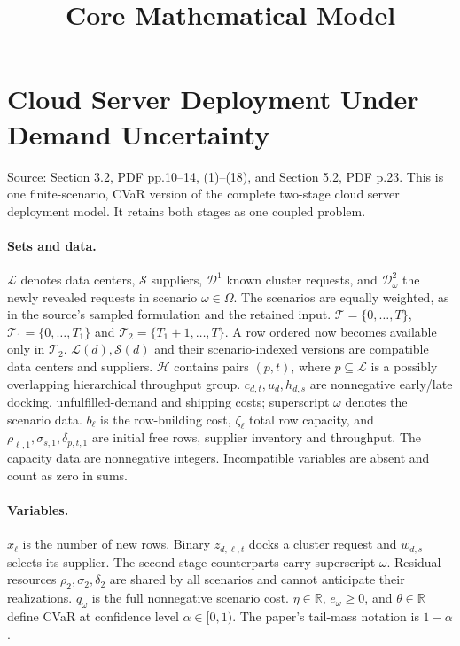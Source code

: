 \documentclass{article}
\title{Core Mathematical Model}
\date{}
\begin{document}
\maketitle

\section*{Cloud Server Deployment Under Demand Uncertainty}

Source: Section 3.2, PDF pp.10--14, (1)--(18), and Section 5.2, PDF p.23.
This is one finite-scenario, CVaR version of the complete two-stage cloud
server deployment model. It retains both stages as one coupled problem.

\paragraph{Sets and data.}
$\mathcal L$ denotes data centers, $\mathcal S$ suppliers,
$\mathcal D^1$ known cluster requests, and $\mathcal D^2_\omega$ the newly
revealed requests in scenario $\omega\in\Omega$. The scenarios are equally
weighted, as in the source's sampled formulation and the retained input.
$\mathcal T=\{0,\ldots,T\}$, $\mathcal T_1=\{0,\ldots,T_1\}$ and
$\mathcal T_2=\{T_1+1,\ldots,T\}$. A row ordered now becomes available only
in $\mathcal T_2$. $\mathcal L(d),\mathcal S(d)$ and their scenario-indexed
versions are compatible data centers and suppliers. $\mathcal H$ contains
pairs $(p,t)$, where $p\subseteq\mathcal L$ is a possibly overlapping
hierarchical throughput group. $c_{d,t},u_d,h_{d,s}$ are nonnegative
early/late docking, unfulfilled-demand and shipping costs; superscript
$\omega$ denotes the scenario data. $b_\ell$ is the row-building cost,
$\zeta_\ell$ total row capacity, and $\rho_{\ell,1},\sigma_{s,1},
\delta_{p,t,1}$ are initial free rows, supplier inventory and throughput.
The capacity data are nonnegative integers. Incompatible variables are
absent and count as zero in sums.

\paragraph{Variables.}
$x_\ell$ is the number of new rows. Binary
$z_{d,\ell,t}$ docks a cluster request and $w_{d,s}$ selects its supplier.
The second-stage counterparts carry superscript $\omega$. Residual
resources $\rho_2,\sigma_2,\delta_2$ are shared by all scenarios and cannot
anticipate their realizations. $q_\omega$ is the full nonnegative scenario
cost. $\eta\in\mathbb R$, $e_\omega\ge0$, and $\theta\in\mathbb R$ define
CVaR at confidence level $\alpha\in[0,1)$. The paper's tail-mass notation
is $1-\alpha$.
\end{document}
